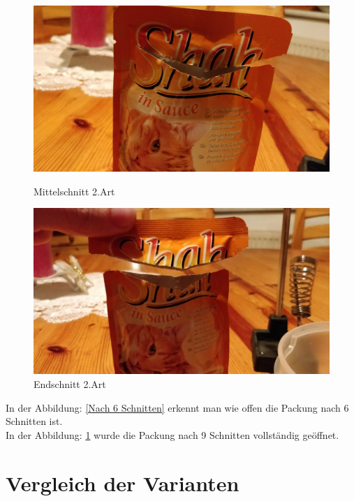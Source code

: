 \begin{figure}[H]
   \begin{minipage}[hbt]{.4\linewidth} %
      \includegraphics[width=\linewidth]{Bilder/Schneideversuch_2.Art/Mittelschnitt}
      \caption{Mittelschnitt 2.Art}
      \label{Nach 6 Schnitten}
   \end{minipage}
   \hspace{.2\linewidth}%
   \begin{minipage}[hbt]{.4\linewidth} %
      \includegraphics[width=\linewidth]{Bilder/Schneideversuch_2.Art/Endschnitt}
      \caption{Endschnitt 2.Art}
      \label{Nach 9 Schnitten}
   \end{minipage}
\end{figure}
In der Abbildung: \ref{Nach 6 Schnitten} erkennt man wie offen die Packung nach 6 Schnitten ist.\\

In der Abbildung: \ref{Nach 9 Schnitten} wurde die Packung nach 9 Schnitten vollständig geöffnet.

\section{Vergleich der Varianten}
